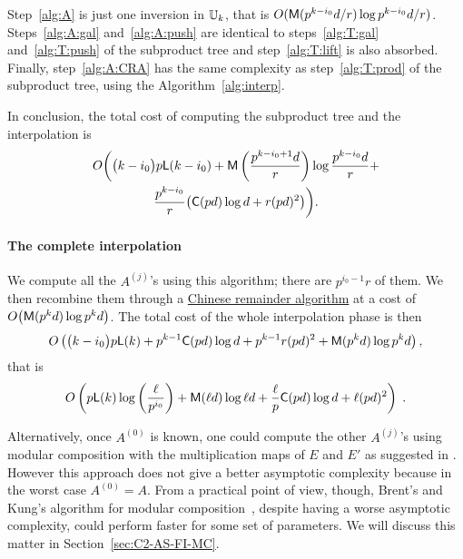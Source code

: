 Step~\ref{alg:A} is just one inversion in $\mathbb{U}_k$, that is
$O(\mathsf{M}(p^{k-i_0}d/r)\log p^{k-i_0}d/r)$. Steps~\ref{alg:A:gal}
and~\ref{alg:A:push} are identical to steps~\ref{alg:T:gal}
and~\ref{alg:T:push} of the subproduct tree and step~\ref{alg:T:lift}
is also absorbed. Finally, step~\ref{alg:A:CRA} has the same
complexity as step~\ref{alg:T:prod} of the subproduct tree, using the
Algorithm~\ref{alg:interp}.

In conclusion, the total cost of computing the subproduct tree and the
interpolation is
\begin{multline*}
  O\biggl(\bigl(k-i_0\bigr)p\mathsf{L}(k-i_0) + \mathsf{M}\left(\frac{p^{k-i_0+1}d}{r}\right)\log \frac{p^{k-i_0}d}{r} +\\
    \frac{p^{k-i_0}}{r}\bigl(\mathsf{C}(pd)\log d + r(pd)^2\bigr)\biggr)
  \text{.}
\end{multline*}


\paragraph{The complete interpolation}
We compute all the $A^{(j)}$'s using this algorithm; there are
$p^{i_0-1}r$ of them. We then recombine them through a
\hyperref[sec:chin-rema-algor]{Chinese remainder algorithm} at a cost
of $O\bigl(\mathsf{M}(p^kd)\log p^kd\bigr)$. The total cost of the whole
interpolation phase is then
\begin{multline*}
  O\left(\bigl(k-i_0\bigr) p\mathsf{L}(k) + p^{k-1}\mathsf{C}(pd)\log d +
    p^{k-1}r(pd)^2 + \mathsf{M}(p^kd)\log p^kd \right)\text{,}
\end{multline*}
that is
\begin{equation}
  \label{eq:interp}
  O\left(p\mathsf{L}(k)\log\left(\frac{\ell}{p^{i_0}}\right) + 
    \mathsf{M}(\ell d)\log\ell d +
    \frac{\ell}{p}\mathsf{C}(pd)\log d +
    \ell (pd)^2
  \right)
  \;\text{.}
\end{equation}

Alternatively, once $A^{(0)}$ is known, one could compute the other
$A^{(j)}$'s using modular composition with the multiplication maps of
$E$ and $E'$ as suggested in \cite{couveignes96}. However this
approach does not give a better asymptotic complexity because in the
worst case $A^{(0)}=A$. From a practical point of view, though,
Brent's and Kung's algorithm for modular
composition~\cite{brent+kung}, despite having a worse asymptotic
complexity, could perform faster for some set of parameters. We will
discuss this matter in Section~\ref{sec:C2-AS-FI-MC}.

